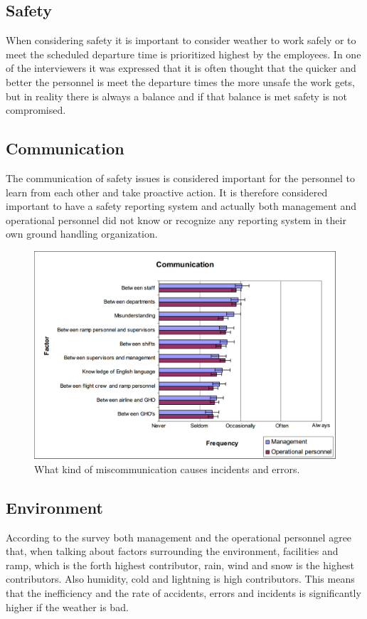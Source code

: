 \subsection{Safety}
When considering safety it is important to consider weather to work safely or to meet the scheduled departure time is prioritized highest by the employees. In one of the interviewers it was expressed that it is often thought that the quicker and better the personnel is meet the departure times the more unsafe the work gets, but in reality there is always a balance and if that balance is met safety is not compromised.

\subsection{Communication}
The communication of safety issues is considered important for the personnel to learn from each other and take proactive action. It is therefore considered important to have a safety reporting system and actually both management and operational personnel did not know or recognize any reporting system in their own ground handling organization.

\begin{figure}[H]
\centering
\includegraphics[width=\textwidth]{Grafik/CommunicationalFactors}
\caption{What kind of miscommunication causes incidents and errors.}
\label{CommunicationalFactors}
\end{figure}

\subsection{Environment}
According to the survey both management and the operational personnel agree that, when talking about factors surrounding the environment, facilities and ramp, which is the forth highest contributor, rain, wind and snow is the highest contributors. Also humidity, cold and lightning is high contributors. This means that the inefficiency and the rate of accidents, errors and incidents is significantly higher if the weather is bad.

